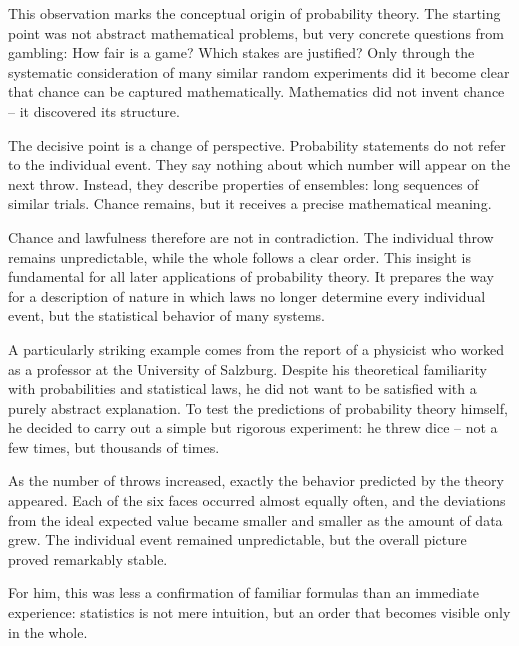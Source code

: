 This observation marks the conceptual origin of probability theory.
The starting point was not abstract mathematical problems,
but very concrete questions from gambling:
How fair is a game?
Which stakes are justified?
Only through the systematic consideration of many similar random experiments
did it become clear
that chance can be captured mathematically.
Mathematics did not invent chance --
it discovered its structure.

The decisive point is a change of perspective.
Probability statements do not refer to the individual event.
They say nothing about
which number will appear on the next throw.
Instead, they describe properties of ensembles:
long sequences of similar trials.
Chance remains,
but it receives a precise mathematical meaning.

Chance and lawfulness therefore are not in contradiction.
The individual throw remains unpredictable,
while the whole follows a clear order.
This insight is fundamental
for all later applications of probability theory.
It prepares the way for a description of nature
in which laws no longer determine every individual event,
but the statistical behavior of many systems.

A particularly striking example comes from the report of a physicist
who worked as a professor at the University of Salzburg.
Despite his theoretical familiarity with probabilities
and statistical laws,
he did not want to be satisfied with a purely abstract explanation.
To test the predictions of probability theory himself,
he decided to carry out a simple
but rigorous experiment:
he threw dice -- not a few times,
but thousands of times.

As the number of throws increased,
exactly the behavior predicted by the theory appeared.
Each of the six faces occurred almost equally often,
and the deviations from the ideal expected value
became smaller and smaller as the amount of data grew.
The individual event remained unpredictable,
but the overall picture proved remarkably stable.

For him, this was less a confirmation of familiar formulas
than an immediate experience:
statistics is not mere intuition,
but an order
that becomes visible only in the whole.

